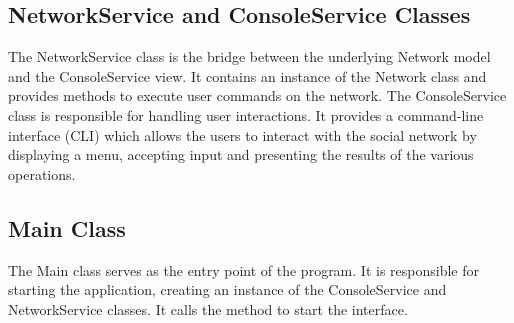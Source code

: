 \subsection*{NetworkService and ConsoleService Classes}
The NetworkService class is the bridge between the underlying Network model and the ConsoleService view. It contains an instance of the Network class and provides methods to execute user commands on the network. The ConsoleService class is responsible for handling user interactions. It provides a command-line interface (CLI) which allows the users to interact with the social network by displaying a menu, accepting input and presenting the results of the various operations.

\subsection*{Main Class}
The Main class serves as the entry point of the program. It is responsible for starting the application, creating an instance of the ConsoleService and NetworkService classes. It calls the method to start the interface.